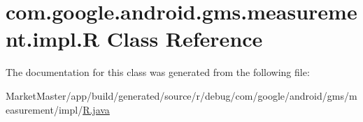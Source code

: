 \hypertarget{classcom_1_1google_1_1android_1_1gms_1_1measurement_1_1impl_1_1R}{}\section{com.\+google.\+android.\+gms.\+measurement.\+impl.\+R Class Reference}
\label{classcom_1_1google_1_1android_1_1gms_1_1measurement_1_1impl_1_1R}


The documentation for this class was generated from the following file\+:\begin{DoxyCompactItemize}
\item 
Market\+Master/app/build/generated/source/r/debug/com/google/android/gms/measurement/impl/\mbox{\hyperlink{debug_2com_2google_2android_2gms_2measurement_2impl_2R_8java}{R.\+java}}\end{DoxyCompactItemize}
